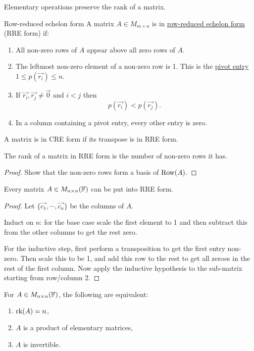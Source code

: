 \documentclass[../Main.tex]{subfiles}
\begin{document}
Elementary operations preserve the rank of a matrix.
\begin{definition}{Row-reduced echelon form}
    A matrix $A \in M_{m\times n}$ is in \underline{row-reduced echelon form} (RRE form) if:
    \begin{enumerate}
        \item All non-zero rows of $A$ appear above all zero rows of $A$.
        \item The leftmost non-zero element of a non-zero row is 1. This is the \underline{pivot entry} $1 \leq p(\vec{r_i}) \leq n$.
        \item If $\vec{r_i}, \vec{r_j} \neq \vec0$ and $i < j$ then
        \begin{equation*}
            p(\vec{r_i}) < p(\vec{r_j}).
        \end{equation*}
        \item In a column containing a pivot entry, every other entry is zero.
    \end{enumerate}
\end{definition}
A matrix is in CRE form if its transpose is in RRE form.
\begin{lemma}
    The rank of a matrix in RRE form is the number of non-zero rows it has.
    \label{lemRRERankIsNonZeroRows}
\end{lemma}
\begin{proof}
    Show that the non-zero rows form a basis of $\operatorname{Row}(A)$.
\end{proof}
\begin{theorem}
    Every matrix $A \in M_{n \times n}(\mathbb{F})$ can be put into RRE form.
    \label{thmRRE}
\end{theorem}
\begin{proof}
    Let $\{\vec{c_1}, \cdots, \vec{c_{n}}\}$ be the columns of $A$.

    Induct on $n$: for the base case scale the first element to 1 and then subtract this from the other columns to get the rest zero.

    For the inductive step, first perform a transposition to get the first entry non-zero. Then scale this to be 1, and add this row to the rest to get all zeroes in the rest of the first column. Now apply the inductive hypothesis to the sub-matrix starting from row/column 2.
\end{proof}
\begin{theorem}
    For $A \in M_{n \times n}(\mathbb{F})$, the following are equivalent:
    \begin{enumerate}
        \item $\operatorname{rk}(A) = n$,
        \item $A$ is a product of elementary matrices,
        \item $A$ is invertible.
    \end{enumerate}
    \label{thmSquareRREProps}
\end{theorem}
\end{document}
